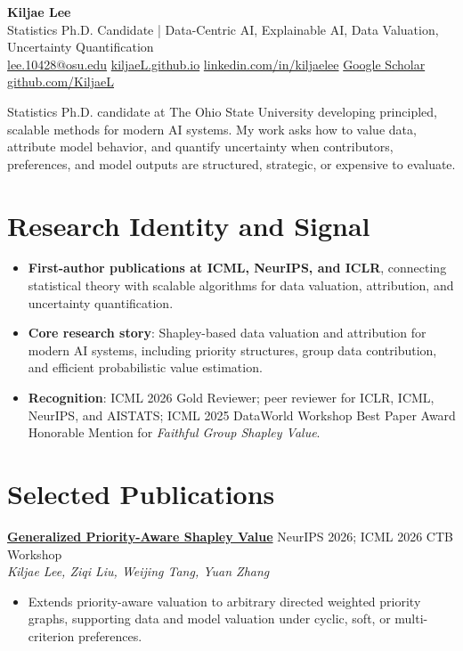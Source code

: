 \documentclass[letterpaper,10pt]{article}
\newcommand{\paperentry}[4]{%
  \textbf{#1} \hfill {\color{muted}#2}\\
  \textit{#3}\\[-2pt]
  \begin{itemize}
    \item #4
  \end{itemize}\vspace{1pt}
}
\begin{document}
{\Huge\bfseries Kiljae Lee}\\[-1pt]
{\color{accent}\large Statistics Ph.D. Candidate | Data-Centric AI, Explainable AI, Data Valuation, Uncertainty Quantification}\\[4pt]
\href{mailto:lee.10428@osu.edu}{lee.10428@osu.edu} \quad
\href{https://kiljaeL.github.io}{kiljaeL.github.io} \quad
\href{https://www.linkedin.com/in/kiljaelee}{linkedin.com/in/kiljaelee} \quad
\href{https://scholar.google.com/citations?user=UsRBPmUAAAAJ&hl=en&oi=sra}{Google Scholar} \quad
\href{https://github.com/KiljaeL}{github.com/KiljaeL}

\vspace{5pt}
{\small
Statistics Ph.D. candidate at The Ohio State University developing principled, scalable methods for modern AI systems. My work asks how to value data, attribute model behavior, and quantify uncertainty when contributors, preferences, and model outputs are structured, strategic, or expensive to evaluate.
}

\section{Research Identity and Signal}
\begin{itemize}
  \item \textbf{First-author publications at ICML, NeurIPS, and ICLR}, connecting statistical theory with scalable algorithms for data valuation, attribution, and uncertainty quantification.
  \item \textbf{Core research story}: Shapley-based data valuation and attribution for modern AI systems, including priority structures, group data contribution, and efficient probabilistic value estimation.
  \item \textbf{Recognition}: ICML 2026 Gold Reviewer; peer reviewer for ICLR, ICML, NeurIPS, and AISTATS; ICML 2025 DataWorld Workshop Best Paper Award Honorable Mention for \textit{Faithful Group Shapley Value}.
\end{itemize}

\section{Selected Publications}
\paperentry
  {\href{https://arxiv.org/abs/2605.15018}{Generalized Priority-Aware Shapley Value}}
  {NeurIPS 2026; ICML 2026 CTB Workshop}
  {Kiljae Lee, Ziqi Liu, Weijing Tang, Yuan Zhang}
  {Extends priority-aware valuation to arbitrary directed weighted priority graphs, supporting data and model valuation under cyclic, soft, or multi-criterion preferences.}
\end{document}
